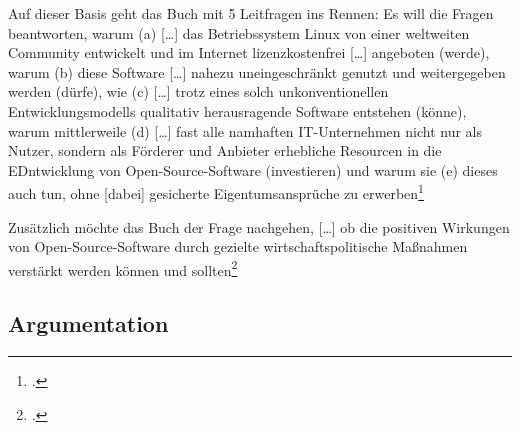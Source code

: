 \documentclass[DIV=calc,BCOR=5mm,11pt,headings=small,oneside,abstract=true, toc=bib]{scrartcl}
\begin{document}
Auf dieser Basis geht das Buch mit 5 Leitfragen ins Rennen: Es will die Fragen
beantworten, warum (a) \glqq{}[\ldots] das Betriebssystem Linux von einer
weltweiten Community entwickelt und im Internet lizenzkostenfrei [\ldots]
angeboten (werde)\grqq{}, warum (b) diese Software \glqq{}[\ldots] nahezu
uneingeschränkt genutzt und weitergegeben werden (dürfe)\grqq{}, wie (c)
\glqq{}[\ldots] trotz eines solch unkonventionellen Entwicklungsmodells
qualitativ herausragende Software entstehen (könne)\grqq{}, warum mittlerweile
(d) \glqq{}[\ldots] fast alle namhaften IT-Unternehmen nicht nur als
Nutzer, sondern als Förderer und Anbieter erhebliche Resourcen in die
EDntwicklung von Open-Source-Software (investieren)\grqq{} und warum sie
(e) dieses auch tun, \glqq{}ohne [dabei] gesicherte Eigentumsansprüche zu
erwerben\grqq{}\footcite[vgl.][3]{Mundhenke2007a}

Zusätzlich möchte das Buch der Frage nachgehen, \glqq{}[\ldots] ob die
positiven Wirkungen von Open-Source-Software durch gezielte
wirtschaftspolitische Maßnahmen verstärkt werden können und
sollten\grqq{}\footcite[vgl.][3]{Mundhenke2007a}

\subsection{Argumentation}
\end{document}
